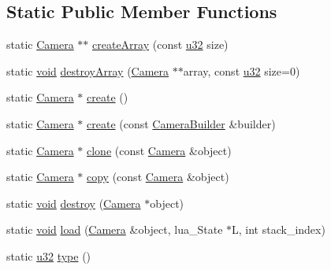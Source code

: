 \subsection*{Static Public Member Functions}
\begin{DoxyCompactItemize}
\item 
static \mbox{\hyperlink{classnjli_1_1_camera}{Camera}} $\ast$$\ast$ \mbox{\hyperlink{classnjli_1_1_camera_a896d192b1e16dde947082d245f63787d}{create\+Array}} (const \mbox{\hyperlink{_util_8h_a10e94b422ef0c20dcdec20d31a1f5049}{u32}} size)
\item 
static \mbox{\hyperlink{_thread_8h_af1e856da2e658414cb2456cb6f7ebc66}{void}} \mbox{\hyperlink{classnjli_1_1_camera_a168d7d1a1c93c674c03a16bd2ef9743e}{destroy\+Array}} (\mbox{\hyperlink{classnjli_1_1_camera}{Camera}} $\ast$$\ast$array, const \mbox{\hyperlink{_util_8h_a10e94b422ef0c20dcdec20d31a1f5049}{u32}} size=0)
\item 
static \mbox{\hyperlink{classnjli_1_1_camera}{Camera}} $\ast$ \mbox{\hyperlink{classnjli_1_1_camera_a507f7feb6c03019a86782cc8b13ba0a8}{create}} ()
\item 
static \mbox{\hyperlink{classnjli_1_1_camera}{Camera}} $\ast$ \mbox{\hyperlink{classnjli_1_1_camera_ae45ea6022038204bea9fc3dc39f978c9}{create}} (const \mbox{\hyperlink{classnjli_1_1_camera_builder}{Camera\+Builder}} \&builder)
\item 
static \mbox{\hyperlink{classnjli_1_1_camera}{Camera}} $\ast$ \mbox{\hyperlink{classnjli_1_1_camera_af4d6b31f5b697697ced38c081005167d}{clone}} (const \mbox{\hyperlink{classnjli_1_1_camera}{Camera}} \&object)
\item 
static \mbox{\hyperlink{classnjli_1_1_camera}{Camera}} $\ast$ \mbox{\hyperlink{classnjli_1_1_camera_a7877ec046260132d8c3869adb77d8c14}{copy}} (const \mbox{\hyperlink{classnjli_1_1_camera}{Camera}} \&object)
\item 
static \mbox{\hyperlink{_thread_8h_af1e856da2e658414cb2456cb6f7ebc66}{void}} \mbox{\hyperlink{classnjli_1_1_camera_a0bb5889b740a1e9834ba49d35cab6ec4}{destroy}} (\mbox{\hyperlink{classnjli_1_1_camera}{Camera}} $\ast$object)
\item 
static \mbox{\hyperlink{_thread_8h_af1e856da2e658414cb2456cb6f7ebc66}{void}} \mbox{\hyperlink{classnjli_1_1_camera_a11f8f0594e29a74b85887ed40e686e94}{load}} (\mbox{\hyperlink{classnjli_1_1_camera}{Camera}} \&object, lua\+\_\+\+State $\ast$L, int stack\+\_\+index)
\item 
static \mbox{\hyperlink{_util_8h_a10e94b422ef0c20dcdec20d31a1f5049}{u32}} \mbox{\hyperlink{classnjli_1_1_camera_a2f963b324689cb9eee90fc5f4b8fcb48}{type}} ()
\end{DoxyCompactItemize}
